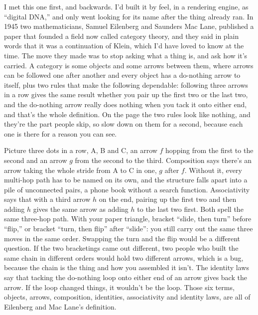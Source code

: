 \documentclass[11pt,twoside]{article}
\theoremstyle{thielethm}
\theoremstyle{thieledef}
\theoremstyle{thieledef}
\theoremstyle{thieledef}
\theoremstyle{thielethm}
\theoremstyle{thieleobs}
\theoremstyle{thielethm}
\begin{document}
I met this one first, and backwards. I'd built it by feel, in a rendering engine, as ``digital DNA,'' and only went looking for its name after the thing already ran. In 1945 two mathematicians, Samuel Eilenberg and Saunders Mac Lane, published a paper that founded a field now called category theory, and they said in plain words that it was a continuation of Klein, which I'd have loved to know at the time. The move they made was to stop asking what a thing is, and ask how it's carried. A category is some objects and some arrows between them, where arrows can be followed one after another and every object has a do-nothing arrow to itself, plus two rules that make the following dependable: following three arrows in a row gives the same result whether you pair up the first two or the last two, and the do-nothing arrow really does nothing when you tack it onto either end, and that's the whole definition. On the page the two rules look like nothing, and they're the part people skip, so slow down on them for a second, because each one is there for a reason you can see.

Picture three dots in a row, A, B and C, an arrow $f$ hopping from the first to the second and an arrow $g$ from the second to the third. Composition says there's an arrow taking the whole stride from A to C in one, $g$ after $f$. Without it, every multi-hop path has to be named on its own, and the structure falls apart into a pile of unconnected pairs, a phone book without a search function. Associativity says that with a third arrow $h$ on the end, pairing up the first two and then adding $h$ gives the same arrow as adding $h$ to the last two first. Both spell the same three-hop path. With your paper triangle, bracket ``slide, then turn'' before ``flip,'' or bracket ``turn, then flip'' after ``slide'': you still carry out the same three moves in the same order. Swapping the turn and the flip would be a different question. If the two bracketings came out different, two people who built the same chain in different orders would hold two different arrows, which is a bug, because the chain is the thing and how you assembled it isn't. The identity laws say that tacking the do-nothing loop onto either end of an arrow gives back the arrow. If the loop changed things, it wouldn't be the loop. Those six terms, objects, arrows, composition, identities, associativity and identity laws, are all of Eilenberg and Mac Lane's definition.
\end{document}
